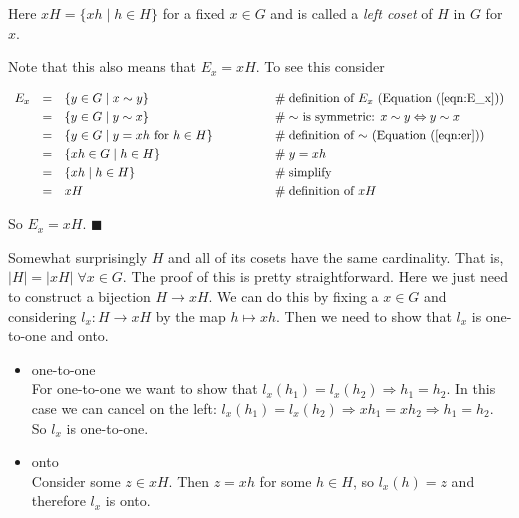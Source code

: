 \documentclass{article}
\theoremstyle{definition}
\begin{document}
\medskip
\noindent
Here $xH = \{xh \mid h \in H\}$ for a fixed $x \in G$ and 
is called a \emph{left coset} of $H$ in $G$ for $x$. 

\bigskip
\noindent
Note that this also means that $E_x = xH$. To see this consider


\begin{equation*}
\begin{array}{llll}
E_x
&=& \{y \in G \mid x \sim y\}                           &\hspace{4em} \mathrel{\#} \text{definition of $E_x$ (Equation (\ref{eqn:E_x}))} \\
[3pt]
&=& \{y \in G \mid y \sim x\}                           &\hspace{4em} \mathrel{\#} \text{$\sim$ is symmetric:
															$x\sim y \Leftrightarrow y\sim x$} \\
[3pt]
&=& \{y \in G \mid y = xh \text{ for } h \in H\}		&\hspace{4em} \mathrel{\#} \text{definition of $\sim$ 
															(Equation (\ref{eqn:er}))} \\
[3pt]
&=& \{xh \in G \mid h \in H\}							&\hspace{4em} \mathrel{\#} y = xh \\
[3pt]
&=& \{xh \mid h \in H\}                                 &\hspace{4em} \mathrel{\#} \text{simplify} \\
[3pt]
&=& xH                                                  &\hspace{4em} \mathrel{\#} \text{definition of $xH$}\\
\end{array}
\end{equation*}

\smallskip
\noindent
So $E_x = xH$. $\blacksquare$

\bigskip
\noindent
Somewhat surprisingly $H$ and all of its cosets have the same
cardinality. That is, $|H| = |xH|\; \forall x \in G$.  The proof
of this is pretty straightforward. Here we just need to construct
a bijection $H \rightarrow xH$. We can do this by fixing a $x \in
G$ and considering $l_x: H \rightarrow xH$ by the map $h \mapsto
xh$. Then we need to show that $l_x$ is one-to-one and onto.

\begin{itemize}
\item one-to-one \\
For one-to-one we want to show that
$l_x(h_1) = l_x(h_2) \Rightarrow h_1 = h_2$. In this case we can
cancel on the left: $l_x(h_1) = l_x(h_2) \Rightarrow xh_1 = xh_2
\Rightarrow h_1 = h_2$.  So $l_x$ is one-to-one.
\item onto \\
Consider some $z \in xH$. Then $z = xh$ for some $h \in H$, so
$l_x(h) = z$ and therefore $l_x$ is onto. 
\end{itemize}
\end{document}
